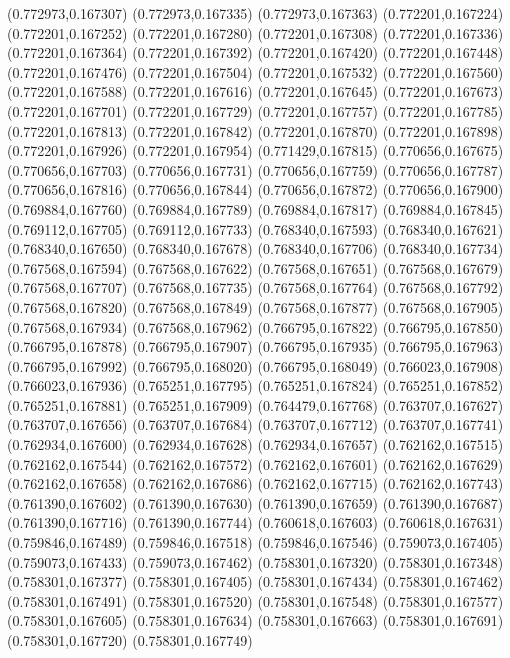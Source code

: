 (0.772973,0.167307)
(0.772973,0.167335)
(0.772973,0.167363)
(0.772201,0.167224)
(0.772201,0.167252)
(0.772201,0.167280)
(0.772201,0.167308)
(0.772201,0.167336)
(0.772201,0.167364)
(0.772201,0.167392)
(0.772201,0.167420)
(0.772201,0.167448)
(0.772201,0.167476)
(0.772201,0.167504)
(0.772201,0.167532)
(0.772201,0.167560)
(0.772201,0.167588)
(0.772201,0.167616)
(0.772201,0.167645)
(0.772201,0.167673)
(0.772201,0.167701)
(0.772201,0.167729)
(0.772201,0.167757)
(0.772201,0.167785)
(0.772201,0.167813)
(0.772201,0.167842)
(0.772201,0.167870)
(0.772201,0.167898)
(0.772201,0.167926)
(0.772201,0.167954)
(0.771429,0.167815)
(0.770656,0.167675)
(0.770656,0.167703)
(0.770656,0.167731)
(0.770656,0.167759)
(0.770656,0.167787)
(0.770656,0.167816)
(0.770656,0.167844)
(0.770656,0.167872)
(0.770656,0.167900)
(0.769884,0.167760)
(0.769884,0.167789)
(0.769884,0.167817)
(0.769884,0.167845)
(0.769112,0.167705)
(0.769112,0.167733)
(0.768340,0.167593)
(0.768340,0.167621)
(0.768340,0.167650)
(0.768340,0.167678)
(0.768340,0.167706)
(0.768340,0.167734)
(0.767568,0.167594)
(0.767568,0.167622)
(0.767568,0.167651)
(0.767568,0.167679)
(0.767568,0.167707)
(0.767568,0.167735)
(0.767568,0.167764)
(0.767568,0.167792)
(0.767568,0.167820)
(0.767568,0.167849)
(0.767568,0.167877)
(0.767568,0.167905)
(0.767568,0.167934)
(0.767568,0.167962)
(0.766795,0.167822)
(0.766795,0.167850)
(0.766795,0.167878)
(0.766795,0.167907)
(0.766795,0.167935)
(0.766795,0.167963)
(0.766795,0.167992)
(0.766795,0.168020)
(0.766795,0.168049)
(0.766023,0.167908)
(0.766023,0.167936)
(0.765251,0.167795)
(0.765251,0.167824)
(0.765251,0.167852)
(0.765251,0.167881)
(0.765251,0.167909)
(0.764479,0.167768)
(0.763707,0.167627)
(0.763707,0.167656)
(0.763707,0.167684)
(0.763707,0.167712)
(0.763707,0.167741)
(0.762934,0.167600)
(0.762934,0.167628)
(0.762934,0.167657)
(0.762162,0.167515)
(0.762162,0.167544)
(0.762162,0.167572)
(0.762162,0.167601)
(0.762162,0.167629)
(0.762162,0.167658)
(0.762162,0.167686)
(0.762162,0.167715)
(0.762162,0.167743)
(0.761390,0.167602)
(0.761390,0.167630)
(0.761390,0.167659)
(0.761390,0.167687)
(0.761390,0.167716)
(0.761390,0.167744)
(0.760618,0.167603)
(0.760618,0.167631)
(0.759846,0.167489)
(0.759846,0.167518)
(0.759846,0.167546)
(0.759073,0.167405)
(0.759073,0.167433)
(0.759073,0.167462)
(0.758301,0.167320)
(0.758301,0.167348)
(0.758301,0.167377)
(0.758301,0.167405)
(0.758301,0.167434)
(0.758301,0.167462)
(0.758301,0.167491)
(0.758301,0.167520)
(0.758301,0.167548)
(0.758301,0.167577)
(0.758301,0.167605)
(0.758301,0.167634)
(0.758301,0.167663)
(0.758301,0.167691)
(0.758301,0.167720)
(0.758301,0.167749)

